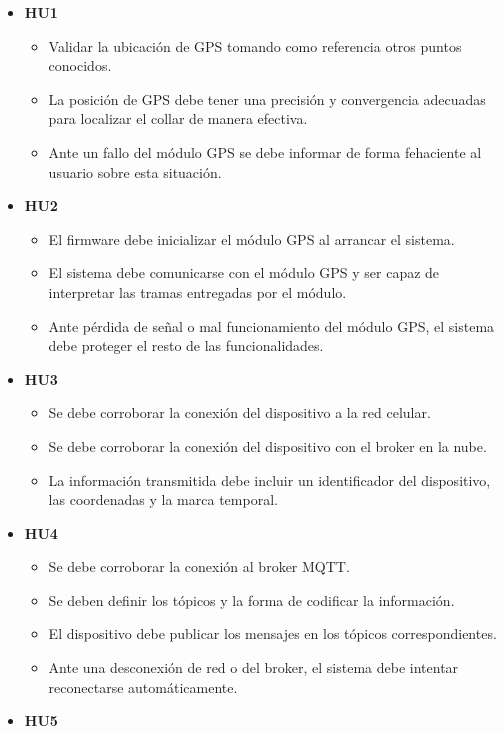 \documentclass[
11pt, %
]{charter}
\begin{document}
\begin{itemize}
	\item \textbf{HU1}
	\begin{itemize}
		\item Validar la ubicación de GPS tomando como referencia otros puntos conocidos.
		\item La posición de GPS debe tener una precisión y convergencia adecuadas para localizar el collar de manera efectiva.
		\item Ante un fallo del módulo GPS se debe informar de forma fehaciente al usuario sobre esta situación.
	\end{itemize}
	\item \textbf{HU2}
	\begin{itemize}
		\item El firmware debe inicializar el módulo GPS al arrancar el sistema.
		\item El sistema debe comunicarse con el módulo GPS y ser capaz de interpretar las tramas entregadas por el módulo.
		\item Ante pérdida de señal o mal funcionamiento del módulo GPS, el sistema debe proteger el resto de las funcionalidades.
	\end{itemize}
	\item \textbf{HU3}
	\begin{itemize}
		\item Se debe corroborar la conexión del dispositivo a la red celular.
		\item Se debe corroborar la conexión del dispositivo con el broker en la nube.
		\item La información transmitida debe incluir un identificador del dispositivo, las coordenadas y la marca temporal.
	\end{itemize}
	\item \textbf{HU4}
	\begin{itemize}
		\item Se debe corroborar la conexión al broker MQTT.
		\item Se deben definir los tópicos y la forma de codificar la información.
		\item El dispositivo debe publicar los mensajes en los tópicos correspondientes.
		\item Ante una desconexión de red o del broker, el sistema debe intentar reconectarse automáticamente.
	\end{itemize}
	\item \textbf{HU5}
	\begin{itemize}

\end{itemize}
\end{itemize}
\end{document}
